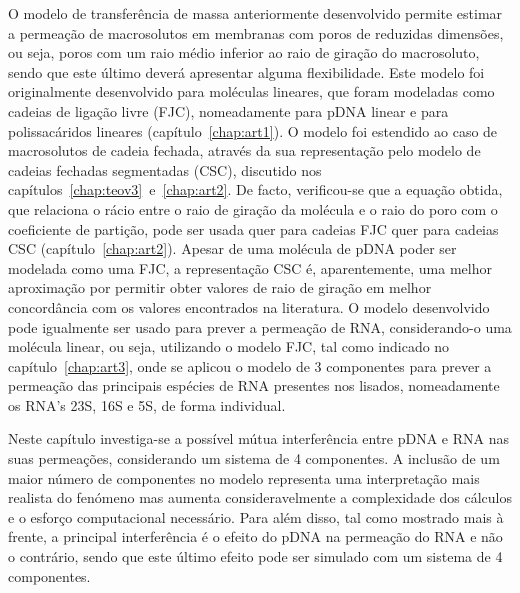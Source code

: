 O modelo de transferência de massa anteriormente desenvolvido permite estimar a permeação de macrosolutos em membranas com poros de reduzidas dimensões, ou seja, poros com um raio médio inferior ao raio de giração do macrosoluto, sendo que este último deverá apresentar alguma flexibilidade. Este modelo foi originalmente desenvolvido para moléculas lineares, que foram modeladas como cadeias de ligação livre (FJC), nomeadamente para pDNA linear e para polissacáridos lineares (capítulo~\ref{chap:art1}). O modelo foi estendido ao caso de macrosolutos de cadeia fechada, através da sua representação pelo modelo de cadeias fechadas segmentadas (CSC), discutido nos capítulos~\ref{chap:teov3}~e~\ref{chap:art2}. De facto, verificou-se que a equação obtida, que relaciona o rácio entre o raio de giração da molécula e o raio do poro com o coeficiente de partição, pode ser usada quer para cadeias FJC quer para cadeias CSC (capítulo~\ref{chap:art2}). Apesar de uma molécula de pDNA poder ser modelada como uma FJC, a representação CSC é, aparentemente, uma melhor aproximação por permitir obter valores de raio de giração em melhor concordância com os valores encontrados na literatura. O modelo desenvolvido pode igualmente ser usado para prever a permeação de RNA, considerando-o uma molécula linear, ou seja, utilizando o modelo FJC, tal como indicado no capítulo~\ref{chap:art3}, onde se aplicou o modelo de 3 componentes para prever a permeação das principais espécies de RNA presentes nos lisados, nomeadamente os RNA's 23S, 16S e 5S, de forma individual. 

Neste capítulo investiga-se a possível mútua interferência entre pDNA e RNA nas suas permeações, considerando um sistema de 4 componentes. A inclusão de um maior número de componentes no modelo representa uma interpretação mais realista do fenómeno mas aumenta consideravelmente a complexidade dos cálculos e o esforço computacional necessário. Para além disso, tal como mostrado mais à frente, a principal interferência é o efeito do pDNA na permeação do RNA e não o contrário, sendo que este último efeito pode ser simulado com um sistema de 4 componentes. 

